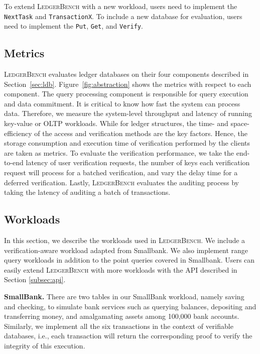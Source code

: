 \documentclass[11pt,dvipdfm]{article}
\newcommand{\systemname}{\textsc{LedgerBench}\xspace}
\begin{document}
To extend \systemname with a new workload, users need to implement the \texttt{NextTask} and \texttt{TransactionX}. To include a new database for evaluation, users need to implement the \texttt{Put}, \texttt{Get}, and \texttt{Verify}. 

\subsection{Metrics}

\systemname evaluates ledger databases on their four components described in Section~\ref{sec:ldb}. Figure~\ref{fig:abstraction} shows the metrics with respect to each component. 
The query processing component is responsible for query execution and data commitment. It is critical to know how fast the system can process data. Therefore, we measure the system-level throughput and latency of running key-value or OLTP workloads.
While for ledger structures, the time- and space-efficiency of the access and verification methods are the key factors. Hence, the storage consumption and execution time of verification performed by the clients are taken as metrics.
To evaluate the verification performance, we take the end-to-end latency of user verification requests, the number of keys each verification request will process for a batched verification, and vary the delay time for a deferred verification.
Lastly, \systemname evaluates the auditing process by taking the latency of auditing a batch of transactions.


\subsection{Workloads}
\label{sec:workload}
In this section, we describe the workloads used in \systemname.
We include a verification-aware workload adapted from Smallbank.
We also implement range query workloads in addition to the point queries covered in Smallbank.
Users can easily extend \systemname with more workloads with the API described in Section \ref{subsec:api}.

\textbf{SmallBank.}
There are two tables in our SmallBank workload, namely saving and checking, to simulate bank services such as querying balances, depositing and transferring money, and amalgamating assets among 100,000 bank accounts. Similarly, we implement all the six transactions in the context of verifiable databases, i.e., each transaction will return the corresponding proof to verify the integrity of this execution.
\end{document}
